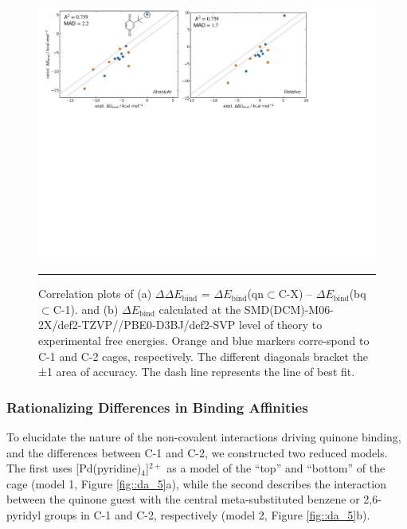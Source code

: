 \documentclass[../../main.tex]{subfiles}
\begin{document}
\begin{figure}[h!]
	\vspace{0.4cm}
	\centering
	\includegraphics[width=\textwidth]{3/da//figs/fig4/fig4.pdf}
	\vspace{0.2cm}
	\hrule
	\caption{Correlation plots of (a) $\Delta\Delta E_\text{bind}$ = $\Delta E_\text{bind}$(qn$\subset$C-X) – $\Delta E_\text{bind}$(bq$\subset$C-1). and (b) $\Delta E_\text{bind}$ calculated at the SMD(DCM)-M06-2X/def2-TZVP//PBE0-D3BJ/def2-SVP level of theory to experimental free energies. Orange and blue markers corre-spond to C-1 and C-2 cages, respectively. The different diagonals bracket the ±1 \kcalx area of accuracy. The dash line represents the line of best fit.}
	\label{fig::da_4}
\end{figure}


\subsubsection{Rationalizing Differences in Binding Affinities}
 To elucidate the nature of the non-covalent interactions driving quinone binding, and the differences between C-1 and C-2, we constructed two reduced models. The first uses [Pd(pyridine)$_4$]$^{2+}$ as a model of the “top” and “bottom” of the cage (model 1, Figure \ref{fig::da_5}a), while the second describes the interaction between the quinone guest with the central meta-substituted benzene or 2,6-pyridyl groups in C-1 and C-2, respectively (model 2, Figure \ref{fig::da_5}b). 
\end{document}
